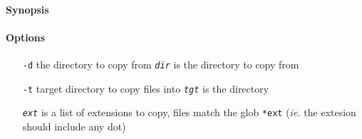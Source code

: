 \documentclass{article}
\begin{document}
\paragraph{Synopsis}   
\paragraph{Options}\begin{itemize}
  \item[\texttt{-d}] the directory to copy from \texttt{\emph{dir}} is the directory to copy from
  \item[\texttt{-t}] target directory to copy files into \texttt{\emph{tgt}} is the directory
  \item[\texttt{\emph{ext}}] is a list of extensions to copy, files match the glob \texttt{*ext} (\emph{ie.} the extesion should include any dot)
\end{itemize}

\begin{tcolorbox}
  
\end{tcolorbox}
\end{document}
